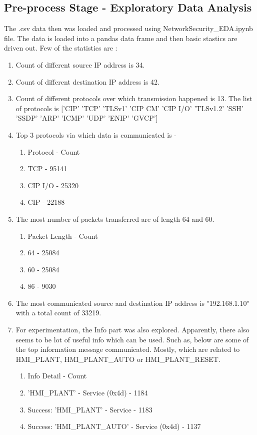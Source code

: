 \documentclass{article}
\begin{document}
\subsection{Pre-process Stage - Exploratory Data Analysis}
The .csv data then was loaded and processed using NetworkSecurity\_EDA.ipynb file. The data is loaded into a pandas data frame and then basic stastics are driven out. Few of the statistics are :
 \begin{enumerate}
    \item Count of different source IP address is 34.
    \item Count of different destination IP address is 42.
    \item Count of different protocols over which transmission happened is 13. The list of protocols is ['CIP' 'TCP' 'TLSv1' 'CIP CM' 'CIP I/O' 'TLSv1.2' 'SSH' 'SSDP' 'ARP'
 'ICMP' 'UDP' 'ENIP' 'GVCP']
    \item 
    Top 3 protocols via which data is communicated is -
    \begin{enumerate}
        \item Protocol  - Count
        \item TCP       - 95141
        \item CIP I/O   - 25320
        \item CIP       - 22188
    \end{enumerate}
    \item The most number of packets transferred are of length 64 and 60.
    \begin{enumerate}
        \item Packet Length - Count
        \item 64       - 25084
        \item 60   - 25084
        \item 86       - 9030
    \end{enumerate}

    \item The most communicated source and destination IP address is "192.168.1.10" with a total count of 33219.

    \item For experimentation, the Info part was also explored. Apparently, there also seems to be lot of useful info which can be used. Such as, below are some of the top information message communicated. Mostly, which are related to HMI\_PLANT, HMI\_PLANT\_AUTO or HMI\_PLANT\_RESET.

\begin{enumerate}
    \item Info Detail - Count 
    \item'HMI\_PLANT' - Service (0x4d) - 1184
\item Success: 'HMI\_PLANT' - Service -  1183
\item Success: 'HMI\_PLANT\_AUTO' - Service (0x4d) - 1137
\end{enumerate}
\end{enumerate}
\end{document}
